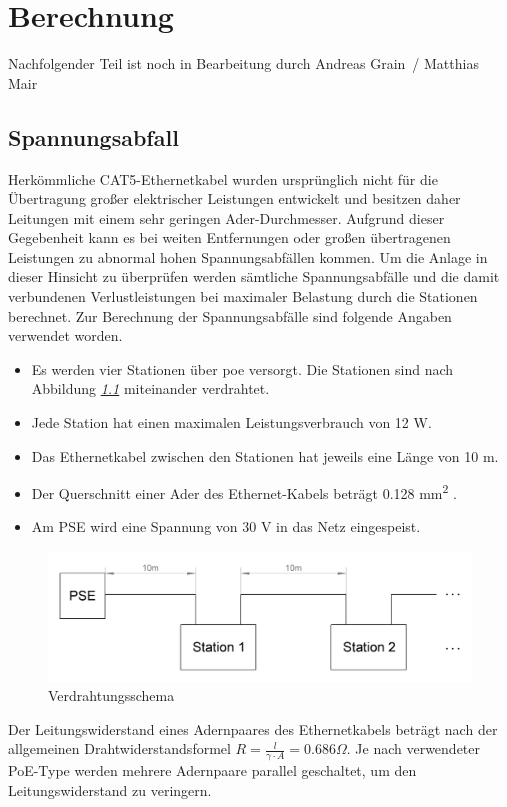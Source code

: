 \documentclass[a4paper, twoside, 12pt, openright]{memoir}
\newcommand{\AndreasGrain}{Andreas Grain}
\newcommand{\MatthiasMair}{Matthias Mair}
\newcommand{\authorName}{\AndreasGrain\ / \MatthiasMair}
\newcommand{\crossref}[1]{\emph{\ref{#1} \nameref{#1}}}
\newcommand{\wip}{{\color{red}Nachfolgender Teil ist noch in Bearbeitung durch \authorName}}
\begin{document}
\chapter{Berechnung}
\wip
\section{Spannungsabfall}
Herkömmliche CAT5-Ethernetkabel wurden ursprünglich nicht für die Übertragung großer elektrischer Leistungen entwickelt und besitzen daher Leitungen mit einem sehr geringen Ader-Durchmesser.
Aufgrund dieser Gegebenheit kann es bei weiten Entfernungen oder großen übertragenen Leistungen zu abnormal hohen Spannungsabfällen kommen.
Um die Anlage in dieser Hinsicht zu überprüfen werden sämtliche Spannungsabfälle und die damit verbundenen Verlustleistungen bei maximaler Belastung durch die Stationen berechnet.
Zur Berechnung der Spannungsabfälle sind folgende Angaben verwendet worden.
\begin{itemize}
	\item Es werden vier Stationen über \ac{poe} versorgt.
	Die Stationen sind nach Abbildung \crossref{fig:poe-verdrahtung} miteinander verdrahtet.
	\item Jede Station hat einen maximalen Leistungsverbrauch von 12 W.
	\item Das Ethernetkabel zwischen den Stationen hat jeweils eine Länge von 10 m.
	\item Der Querschnitt einer Ader des Ethernet-Kabels beträgt 0.128 mm\textsuperscript{2} \cite[vgl.][]{lapp-cat5-datasheet}.
	\item Am PSE wird eine Spannung von 30 V in das Netz eingespeist.
\end{itemize}
\begin{figure}[H]
	\centering
	\includegraphics[width=.9\linewidth]{images/berechnung/poe_verdrahtung.png}
	\caption{Verdrahtungsschema}
	\label{fig:poe-verdrahtung}
\end{figure}
Der Leitungswiderstand eines Adernpaares des Ethernetkabels beträgt nach der allgemeinen Drahtwiderstandsformel $R=\frac{l}{\gamma\cdot A}=0.686\Omega$.
Je nach verwendeter PoE-Type werden mehrere Adernpaare parallel geschaltet, um den Leitungswiderstand zu veringern.
\end{document}
